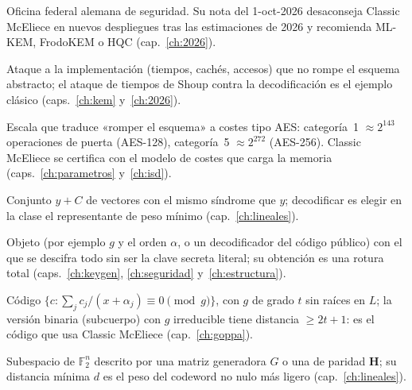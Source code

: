 \documentclass[11pt,a4paper,oneside]{report}
\newcommand{\F}{\mathbb{F}}
\newcommand{\Hmat}{\mathbf{H}}          %
\newcommand{\Ftwo}{\F_2}
\begin{document}
\begin{description}[leftmargin=2.6em,style=nextline,itemsep=2.5pt,parsep=0pt]
  \item[\textbf{BSI} (\emph{Bundesamt für Sicherheit in der
        Informationstechnik})]
        Oficina federal alemana de seguridad. Su nota del
        1-oct-2026 desaconseja Classic McEliece en nuevos
        despliegues tras las estimaciones de 2026 y recomienda
        ML-KEM, FrodoKEM o HQC (cap.~\ref{ch:2026}).

  \item[\textbf{Canal lateral}]
        Ataque a la implementación (tiempos, cachés, accesos)
        que no rompe el esquema abstracto; el ataque de tiempos de
        Shoup contra la decodificación es el ejemplo clásico
        (caps.~\ref{ch:kem} y~\ref{ch:2026}).

  \item[\textbf{Categorías (NIST)}]
        Escala que traduce «romper el esquema» a costes tipo AES:
        categoría~1 $\approx2^{143}$ operaciones de puerta
        (AES-128), categoría~5 $\approx2^{272}$ (AES-256). Classic
        McEliece se certifica con el modelo de costes que carga la
        memoria (caps.~\ref{ch:parametros} y~\ref{ch:isd}).

  \item[\textbf{Clase lateral}]
        Conjunto $y+C$ de vectores con el mismo síndrome que $y$;
        decodificar es elegir en la clase el representante de peso
        mínimo (cap.~\ref{ch:lineales}).

  \item[\textbf{Clave equivalente}]
        Objeto (por ejemplo $g$ y el orden $\alpha$, o un
        decodificador del código público) con el que se descifra
        todo sin ser la clave secreta literal; su obtención es una
        rotura total (caps.~\ref{ch:keygen}, \ref{ch:seguridad}
        y~\ref{ch:estructura}).

  \item[\textbf{Código de Goppa} ($\Gamma_2(L,g)$)]
        Código $\{c:\sum_j c_j/(x+\alpha_j)\equiv0\pmod g\}$, con
        $g$ de grado $t$ sin raíces en $L$; la versión binaria
        (subcuerpo) con $g$ irreducible tiene distancia
        $\ge2t+1$: es el código que usa Classic McEliece
        (cap.~\ref{ch:goppa}).

  \item[\textbf{Código lineal}]
        Subespacio de $\Ftwo^n$ descrito por una matriz generadora
        $G$ o una de paridad $\Hmat$; su distancia mínima $d$ es
        el peso del codeword no nulo más ligero
        (cap.~\ref{ch:lineales}).


\end{description}
\end{document}
